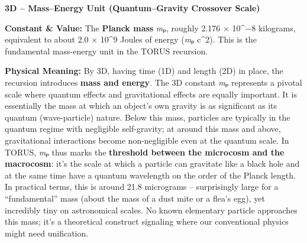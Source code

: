 \documentclass[
]{article}
\begin{document}
\textbf{3D -- Mass--Energy Unit (Quantum--Gravity Crossover Scale)}

\textbf{Constant \& Value:} The \textbf{Planck mass} \emph{m}ₚ, roughly
2.176 × 10\^{}−8 kilograms\hspace{0pt}, equivalent to about 2.0 ×
10\^{}9 Joules of energy (\emph{m}ₚ c\^{}2). This is the fundamental
mass-energy unit in the TORUS recursion.

\textbf{Physical Meaning:} By 3D, having time (1D) and length (2D) in
place, the recursion introduces \textbf{mass and energy}. The 3D
constant \emph{m}ₚ represents a pivotal scale where quantum effects and
gravitational effects are equally important. It is essentially the mass
at which an object's own gravity is as significant as its quantum
(wave-particle) nature\hspace{0pt}. Below this mass, particles are
typically in the quantum regime with negligible self-gravity; at around
this mass and above, gravitational interactions become non-negligible
even at the quantum scale. In TORUS, \emph{m}ₚ thus marks the
\textbf{threshold between the microcosm and the macrocosm}\hspace{0pt}:
it's the scale at which a particle can gravitate like a black hole and
at the same time have a quantum wavelength on the order of the Planck
length. In practical terms, this is around 21.8 micrograms --
surprisingly large for a ``fundamental'' mass (about the mass of a dust
mite or a flea's egg), yet incredibly tiny on astronomical
scales\hspace{0pt}. No known elementary particle approaches this mass;
it's a theoretical construct signaling where our conventional physics
might need unification.
\end{document}
